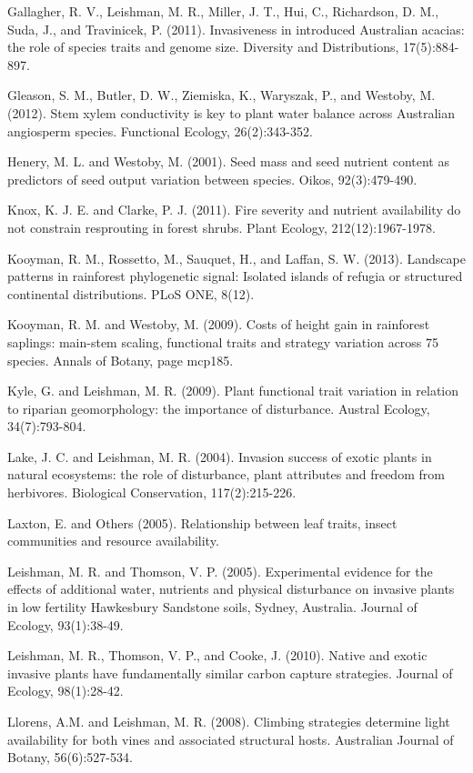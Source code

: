 \documentclass[openright,12pt,a4paper]{memoir}
\begin{document}
Gallagher, R. V., Leishman, M. R., Miller, J. T., Hui, C., Richardson, D. M., Suda, J., and Travinicek, P. (2011). Invasiveness in introduced Australian acacias: the role of species traits and genome size. Diversity and Distributions, 17(5):884-897.

Gleason, S. M., Butler, D. W., Ziemiska, K., Waryszak, P., and Westoby, M. (2012). Stem xylem conductivity is key to plant water balance across Australian angiosperm species. 
Functional Ecology, 26(2):343-352.

Henery, M. L. and Westoby, M. (2001). Seed mass and seed nutrient content as predictors of seed output variation between species. Oikos, 92(3):479-490.

Knox, K. J. E. and Clarke, P. J. (2011). Fire severity and nutrient availability do not constrain resprouting in forest shrubs. Plant Ecology, 212(12):1967-1978.

Kooyman, R. M., Rossetto, M., Sauquet, H., and Laffan, S. W. (2013). Landscape patterns in rainforest phylogenetic signal: Isolated islands of refugia or structured continental distributions. PLoS ONE, 8(12).

Kooyman, R. M. and Westoby, M. (2009). Costs of height gain in rainforest saplings: main-stem scaling, functional traits and strategy variation across 75 species. Annals of Botany, page mcp185.

Kyle, G. and Leishman, M. R. (2009). Plant functional trait variation in relation to riparian geomorphology: the importance of disturbance. Austral Ecology, 34(7):793-804.

Lake, J. C. and Leishman, M. R. (2004). Invasion success of exotic plants in natural ecosystems: the role of disturbance, plant attributes and freedom from herbivores. Biological Conservation, 117(2):215-226.

Laxton, E. and Others (2005). Relationship between leaf traits, insect communities and resource availability.

Leishman, M. R. and Thomson, V. P. (2005). Experimental evidence for the effects of additional water, nutrients and physical disturbance on invasive plants in low fertility Hawkesbury Sandstone soils, Sydney, Australia. Journal of Ecology, 93(1):38-49.

Leishman, M. R., Thomson, V. P., and Cooke, J. (2010). Native and exotic invasive plants have fundamentally similar carbon capture strategies. Journal of Ecology, 98(1):28-42.

Llorens, A.M. and Leishman, M. R. (2008). Climbing strategies determine light availability for both vines and associated structural hosts. Australian Journal of Botany, 56(6):527-534.
\end{document}
